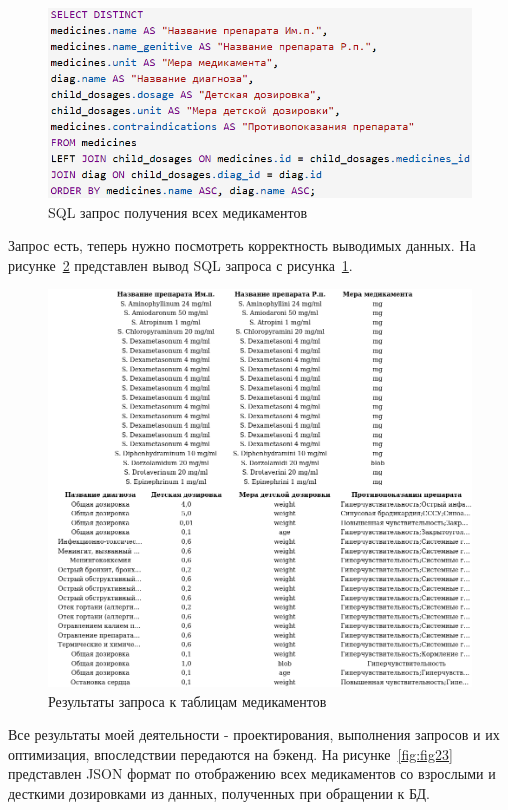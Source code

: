\begin{figure}
  \includegraphics[scale=0.78]{inc/sh_all_ch_med}
  \caption{SQL запрос получения всех медикаментов}
  \label{fig:fig21}
\end{figure}

Запрос есть, теперь нужно посмотреть корректность выводимых данных. На рисунке~\ref{fig:fig22} представлен вывод SQL запроса с рисунка~\ref{fig:fig21}.

\begin{figure}
  \includegraphics[scale=0.955]{inc/sh_all_ch_med1}
  \caption{Результаты запроса к таблицам медикаментов}
  \label{fig:fig22}
\end{figure}

Все результаты моей деятельности - проектирования, выполнения запросов и их оптимизация, впоследствии передаются на бэкенд. На рисунке~\ref{fig:fig23} представлен JSON формат по отображению всех медикаментов со взрослыми и десткими дозировками из данных, полученных при обращении к БД.

